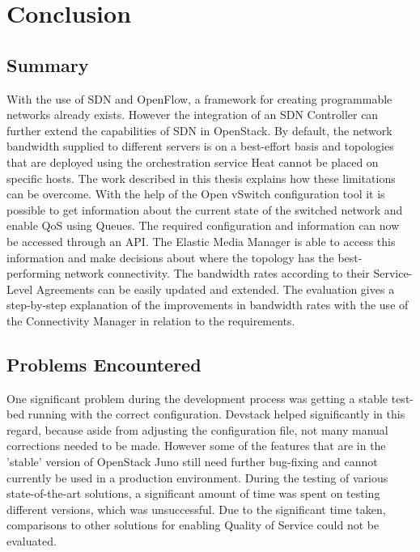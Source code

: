  \cleardoublepage
\chapter{Conclusion}

\section{Summary}

With the use of SDN and OpenFlow, a framework for creating programmable networks already exists. However the integration of an SDN Controller can further extend the capabilities of SDN in OpenStack. By default, the network bandwidth supplied to different servers is on a best-effort basis and topologies that are deployed using the orchestration service Heat cannot be placed on specific hosts. The work described in this thesis explains how these limitations can be overcome. With the help of the Open vSwitch configuration tool it is possible to get information about the current state of the switched network and enable QoS using Queues. The required configuration and information can now be accessed through an API. The Elastic Media Manager is able to access this information and make decisions about where the topology has the best-performing network connectivity. The bandwidth rates according to their Service-Level Agreements can be easily updated and extended. The evaluation gives a step-by-step explanation of the improvements in bandwidth rates with the use of the Connectivity Manager in relation to the requirements.

\section{Problems Encountered}

One significant problem during the development process was getting a stable test-bed running with the correct configuration. Devstack helped significantly in this regard, because aside from adjusting the configuration file, not many manual corrections needed to be made. However some of the features that are in the 'stable' version of OpenStack Juno still need further bug-fixing and cannot currently be used in a production environment. During the testing of various state-of-the-art solutions, a significant amount of time was spent on testing different versions, which was unsuccessful. Due to the significant time taken, comparisons to other solutions for enabling Quality of Service could not be evaluated. 

